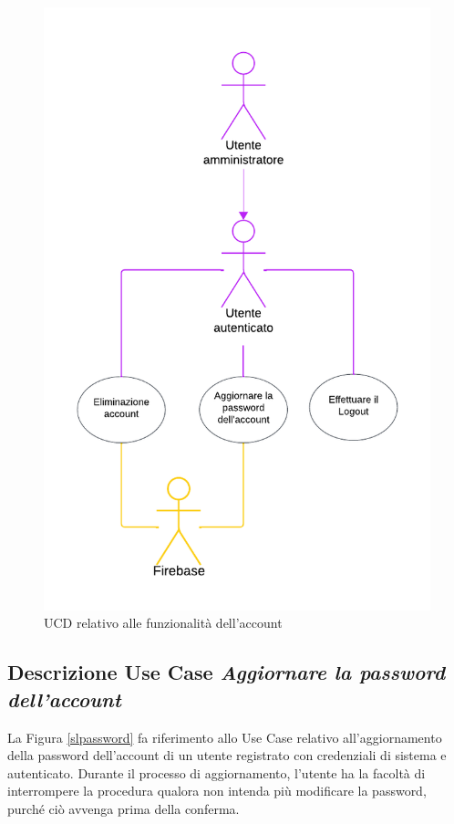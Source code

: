 \documentclass[11pt, a4paper]{article}
\theoremstyle{definition} %
\begin{document}
\begin{figure}[H]
\centering
\includegraphics[scale = 0.88]{materiale/ucdiagrams/ucaccount.pdf}
\caption{UCD relativo alle funzionalità dell'account}
\label{accountfig}
\end{figure}



\newpage
\subsection*{Descrizione Use Case \textit{Aggiornare la password dell'account}}
La Figura \ref{slpassword} fa riferimento allo Use Case relativo all'aggiornamento
della password dell'account di un utente registrato con credenziali di sistema e autenticato.
Durante il processo di aggiornamento, l'utente ha la facoltà di interrompere
la procedura qualora non intenda più modificare la password, purché ciò avvenga
prima della conferma.
\end{document}
